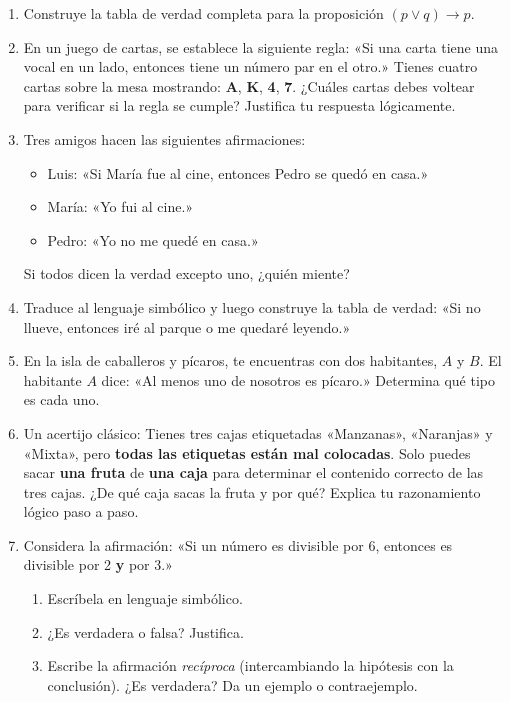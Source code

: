 \documentclass[12pt, letterpaper]{article}
\begin{document}
\begin{enumerate}[leftmargin=*]
  \item \medio{} Construye la tabla de verdad completa para la proposición $(p \vee q) \rightarrow p$.

  \item \medio{} En un juego de cartas, se establece la siguiente regla: «Si una carta tiene una vocal en un lado, entonces tiene un número par en el otro.» Tienes cuatro cartas sobre la mesa mostrando: \textbf{A}, \textbf{K}, \textbf{4}, \textbf{7}. ¿Cuáles cartas debes voltear para verificar si la regla se cumple? Justifica tu respuesta lógicamente.

  \item \medio{} Tres amigos hacen las siguientes afirmaciones:
        \begin{itemize}
          \item Luis: «Si María fue al cine, entonces Pedro se quedó en casa.»
          \item María: «Yo fui al cine.»
          \item Pedro: «Yo no me quedé en casa.»
        \end{itemize}
        Si todos dicen la verdad excepto uno, ¿quién miente?

  \item \medio{} Traduce al lenguaje simbólico y luego construye la tabla de verdad: «Si no llueve, entonces iré al parque o me quedaré leyendo.»

  \item \dificil{} En la isla de caballeros y pícaros, te encuentras con dos habitantes, $A$ y $B$. El habitante $A$ dice: «Al menos uno de nosotros es pícaro.» Determina qué tipo es cada uno.

  \item \dificil{} Un acertijo clásico: Tienes tres cajas etiquetadas «Manzanas», «Naranjas» y «Mixta», pero \textbf{todas las etiquetas están mal colocadas}. Solo puedes sacar \textbf{una fruta} de \textbf{una caja} para determinar el contenido correcto de las tres cajas. ¿De qué caja sacas la fruta y por qué? Explica tu razonamiento lógico paso a paso.

  \item \dificil{} Considera la afirmación: «Si un número es divisible por 6, entonces es divisible por 2 \textbf{y} por 3.»
        \begin{enumerate}[label=\alph*)]
          \item Escríbela en lenguaje simbólico.
          \item ¿Es verdadera o falsa? Justifica.
          \item Escribe la afirmación \emph{recíproca} (intercambiando la hipótesis con la conclusión). ¿Es verdadera? Da un ejemplo o contraejemplo.
        \end{enumerate}
\end{enumerate}
\end{document}
